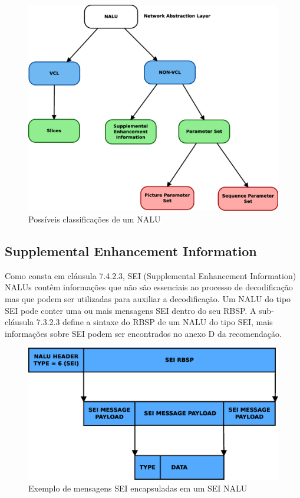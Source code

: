 \begin{figure}[H]
\centering
\includegraphics[scale=0.4]{imagens/fig7.eps}
\caption{Possíveis classificações de um NALU}
\label{fig:vcl_nonvcl}
\end{figure}


\subsection{Supplemental Enhancement Information}

Como consta em \cite{ituh264avc} cláusula 7.4.2.3, SEI (Supplemental Enhancement Information) NALUs contêm informações que não são essenciais ao processo de decodificação mas que podem ser utilizadas para auxiliar a decodificação. Um NALU do tipo SEI pode conter uma ou mais mensagens SEI dentro do seu RBSP. A sub-cláusula 7.3.2.3 define a sintaxe do RBSP de um NALU do tipo SEI, mais informações sobre SEI podem ser encontrados no anexo D da recomendação.


\begin{figure}[H]
\centering
\includegraphics[scale=0.5]{imagens/fig4.eps}
\caption{Exemplo de mensagens SEI encapsuladas em um SEI NALU}
\label{fig:sei_nalu}
\end{figure}


